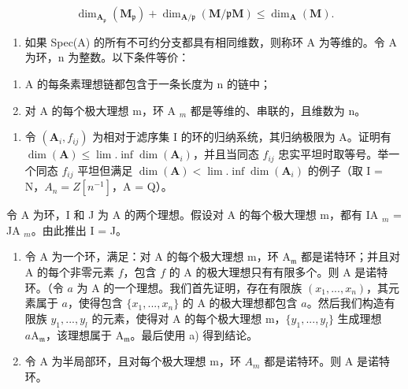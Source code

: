 \[
\dim_ {\mathbf {A} _ {\mathfrak {p}}} (\mathbf {M} _ {\mathfrak {p}}) + \dim_ {\mathbf {A} / \mathfrak {p}} (\mathbf {M} / \mathfrak {p} \mathbf {M}) \leqslant \dim_ {\mathbf {A}} (\mathbf {M}).
\]

\begin{enumerate}
\def\labelenumi{\arabic{enumi})}
\setcounter{enumi}{9}
\tightlist
\item
  如果 Spec(A) 的所有不可约分支都具有相同维数，则称环 A 为等维的。令 A 为环，n 为整数。以下条件等价：
\end{enumerate}

\begin{enumerate}
\def\labelenumi{\alph{enumi})}
\tightlist
\item
  A 的每条素理想链都包含于一条长度为 n 的链中；
\item
  对 A 的每个极大理想 m，环 A \(_{m}\) 都是等维的、串联的，且维数为 n。
\end{enumerate}

\begin{enumerate}
\def\labelenumi{\arabic{enumi})}
\setcounter{enumi}{10}
\tightlist
\item
  令 \((\mathbf{A}_{i}, f_{ij})\) 为相对于滤序集 I 的环的归纳系统，其归纳极限为 A。证明有 \(\dim(\mathbf{A}) \leqslant \lim.\inf\dim(\mathbf{A}_{i})\)，并且当同态 \(f_{ij}\) 忠实平坦时取等号。举一个同态 \(f_{ij}\) 平坦但满足 \(\dim(\mathbf{A}) < \lim.\inf\dim(\mathbf{A}_{i})\) 的例子（取 I = N，\(A_{n} = Z[n^{-1}]\)，A = Q）。
\end{enumerate}

令 A 为环，I 和 J 为 A 的两个理想。假设对 A 的每个极大理想 m，都有 IA \(_{m}\) = JA \(_{m}\)。由此推出 I = J。

\begin{enumerate}
\def\labelenumi{\alph{enumi})}
\setcounter{enumi}{1}
\item
  令 A 为一个环，满足：对 A 的每个极大理想 m，环 \(\mathrm{A}_{\mathfrak{m}}\) 都是诺特环；并且对 A 的每个非零元素 \(f\)，包含 \(f\) 的 A 的极大理想只有有限多个。则 A 是诺特环。（令 \(a\) 为 A 的一个理想。我们首先证明，存在有限族 \((x_1, ..., x_n)\)，其元素属于 \(a\)，使得包含 \(\{x_1, ..., x_n\}\) 的 A 的极大理想都包含 \(a\)。然后我们构造有限族 \(y_1, ..., y_l\) 的元素，使得对 A 的每个极大理想 m，\(\{y_1, ..., y_l\}\) 生成理想 \(a\mathrm{A}_{\mathfrak{m}}\)，该理想属于 \(\mathrm{A}_{\mathfrak{m}}\)。最后使用 a) 得到结论。
\item
  令 A 为半局部环，且对每个极大理想 m，环 \(A_{m}\) 都是诺特环。则 A 是诺特环。
\end{enumerate}

